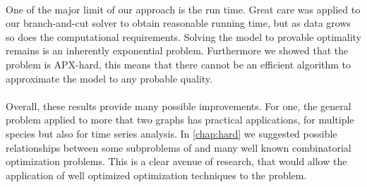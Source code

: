 \paragraph{}
One of the major limit of our approach is the run time.
Great care was applied to our branch-and-cut solver to obtain reasonable running time, but as data grows so does the computational requirements.
Solving the model to provable optimality remains is an inherently exponential problem.
Furthermore we showed that the problem is APX-hard, this means that there cannot be an efficient algorithm to approximate the model to any probable quality.

\paragraph{}
Overall, these results provide many possible improvements.
For one, the general problem applied to more that two graphs has practical applications, for multiple species but also for time series analysis.
In \cref{chap:hard} we suggested possible relationships between some subproblems of \mwccs{} and many well known combinatorial optimization problems.
This is a clear avenue of research, that would allow the application of well optimized optimization techniques to the \mwccs{} problem.

